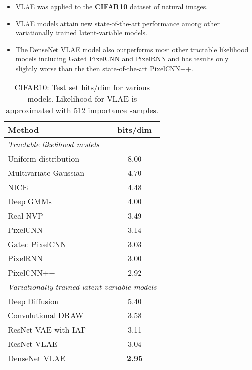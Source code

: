 \documentclass[12pt]{article}
\begin{document}
\begin{itemize}
    \item VLAE was applied to the \textbf{CIFAR10} dataset of natural images.
    \item VLAE models attain new state-of-the-art performance among other variationally trained latent-variable models.
    \item The DenseNet VLAE model also outperforms most other tractable likelihood models including Gated PixelCNN and PixelRNN and has results only slightly worse than the then state-of-the-art PixelCNN++.
\end{itemize}
\begin{table}[H]
    \centering
    \caption{CIFAR10: Test set bits/dim for various models. Likelihood for VLAE is approximated with 512 importance samples.}
    \label{tab:cifar10}
    \begin{tabular}{lc}
    \toprule
    \textbf{Method} & \textbf{bits/dim} \\
    \midrule
    \multicolumn{2}{l}{\textit{Tractable likelihood models}} \\
    \midrule
    Uniform distribution \cite{van2016pixel} & 8.00 \\
    Multivariate Gaussian \cite{van2016pixel} & 4.70 \\
    NICE \cite{dinh2014nice} & 4.48 \\
    Deep GMMs \cite{oord2014deep} & 4.00 \\
    Real NVP \cite{dinh2016density} & 3.49 \\
    PixelCNN \cite{van2016pixel} & 3.14 \\
    Gated PixelCNN \cite{van2016conditional} & 3.03 \\
    PixelRNN \cite{van2016pixel} & 3.00 \\
    PixelCNN++ \cite{salimans2017pixelcnn++} & 2.92 \\
    \midrule
    \multicolumn{2}{l}{\textit{Variationally trained latent-variable models}} \\
    \midrule
    Deep Diffusion \cite{sohl2015deep} & 5.40 \\
    Convolutional DRAW \cite{gregor2016towards} & 3.58 \\
    ResNet VAE with IAF \cite{kingma2016improved} & 3.11 \\
    ResNet VLAE & 3.04 \\
    DenseNet VLAE & \textbf{2.95} \\
    \bottomrule
    \end{tabular}
\end{table}
\end{document}
